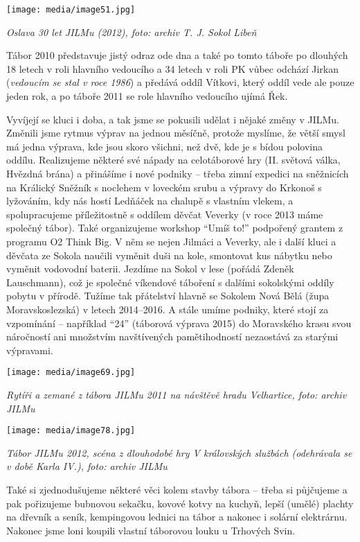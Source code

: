 \texttt{[image: media/image51.jpg]}

\emph{Oslava 30 let JILMu (2012), foto: archiv T. J. Sokol Libeň}

Tábor 2010 představuje jistý odraz ode dna a také po tomto táboře po
dlouhých 18 letech v roli hlavního vedoucího a 34 letech v roli PK vůbec
odchází Jirkan (\emph{vedoucím se stal v roce 1986}) a předává oddíl
Vítkovi, který oddíl vede ale pouze jeden rok, a po táboře 2011 se role
hlavního vedoucího ujímá Řek.

Vyvíjejí se kluci i doba, a tak jsme se pokusili udělat i nějaké změny v
JILMu. Změnili jsme rytmus výprav na jednou měsíčně, protože myslíme, že
větší smysl má jedna výprava, kde jsou skoro všichni, než dvě, kde je s
bídou polovina oddílu. Realizujeme některé své nápady na celotáborové
hry (II. světová válka, Hvězdná brána) a přinášíme i nové podniky --
třeba zimní expedici na sněžnicích na Králický Sněžník s noclehem v
loveckém srubu a výpravy do Krkonoš s lyžováním, kdy nás hostí Ledňáček
na chalupě s vlastním vlekem, a spolupracujeme příležitostně s oddílem
děvčat Veverky (v roce 2013 máme společný tábor). Také organizujeme
workshop ``Umíš to!'' podpořený grantem z programu O2 Think Big. V něm
se nejen Jilmáci a Veverky, ale i další kluci a děvčata ze Sokola
naučili vyměnit duši na kole, smontovat kus nábytku nebo vyměnit
vodovodní baterii. Jezdíme na Sokol v lese (pořádá Zdeněk Lauschmann),
což je společné víkendové táboření s dalšími sokolskými oddíly pobytu v
přírodě. Tužíme tak přátelství hlavně se Sokolem Nová Bělá (župa
Moravskoslezská) v letech 2014--2016. A stále umíme podniky, které stojí
za vzpomínání -- například ``24'' (táborová výprava 2015) do Moravského
krasu svou náročností ani množstvím navštívených pamětihodností
nezaostává za starými výpravami.

\texttt{[image: media/image69.jpg]}

\emph{Rytíři a zemané z tábora JILMu 2011 na návštěvě hradu Velhartice,
foto: archiv JILMu}

\texttt{[image: media/image78.jpg]}

\emph{Tábor JILMu 2012, scéna z dlouhodobé hry V královských službách
(odehrávala se v době Karla IV.), foto: archiv JILMu}

Také si zjednodušujeme některé věci kolem stavby tábora -- třeba si
půjčujeme a pak pořizujeme bubnovou sekačku, kovové kotvy na kuchyň,
lepší (umělé) plachty na dřevník a seník, kempingovou lednici na tábor a
nakonec i solární elektrárnu. Nakonec jsme loni koupili vlastní
táborovou louku u Trhových Svin.

